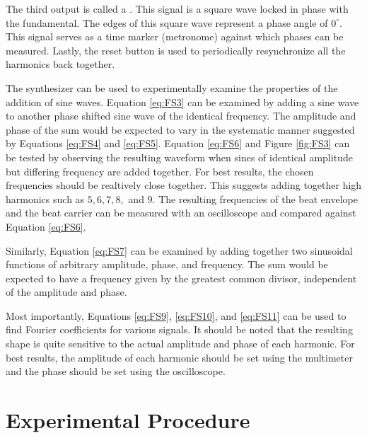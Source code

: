 \noindent The third output is called a . This signal is a square wave locked in phase with the fundamental. The edges of this square wave represent a phase angle of $0^{\circ}$. This signal serves as a time marker (metronome) against which phases can be measured. Lastly, the reset button is used to periodically resynchronize all the harmonics back together.

\noindent The synthesizer can be used to experimentally examine the properties of the addition of sine waves. Equation \ref{eq:FS3} can be examined by adding a sine wave to another phase shifted sine wave of the identical frequency. The amplitude and phase of the sum would be expected to vary in the systematic manner suggested by Equations \ref{eq:FS4} and \ref{eq:FS5}. Equation \ref{eq:FS6} and Figure \ref{fig:FS3} can be tested by observing the resulting waveform when sines of identical amplitude but differing frequency are added together. For best results, the chosen frequencies should be realtively close together. This suggests adding together high harmonics such as $5,6,7,8,$ and $9$. The resulting frequencies of the beat envelope and the beat carrier can be measured with an oscilloscope and compared against Equation \ref{eq:FS6}.

\noindent Similarly, Equation \ref{eq:FS7} can be examined by adding together two sinusoidal functions of arbitrary amplitude, phase, and frequency. The sum would be expected to have a frequency given by the greatest common divisor, independent of the amplitude and phase.

\noindent Most importantly, Equations \ref{eq:FS9}, \ref{eq:FS10}, and \ref{eq:FS11} can be used to find Fourier coefficients for various signals. It should be noted that the resulting shape is quite sensitive to the actual amplitude and phase of each harmonic. For best results, the amplitude of each harmonic should be set using the multimeter and the phase should be set using the oscilloscope.

\section{Experimental Procedure}


